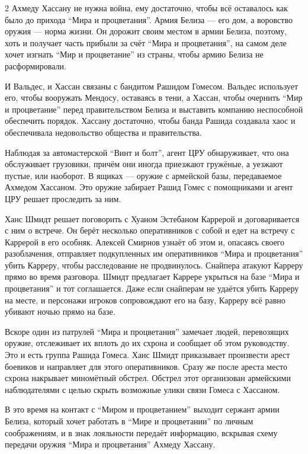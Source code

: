 \documentclass[twoside]{article}
\begin{document}
\begin{multicols}{2}
Ахмеду Хассану не нужна война, ему достаточно, чтобы всё оставалось как
было до прихода \enquote{Мира и процветания}. Армия Белиза --- его дом, а
воровство оружия --- норма жизни. Он дорожит своим местом в армии Белиза,
поэтому, хоть и получает часть прибыли за счёт \enquote{Мира и процветания}, на
самом деле хочет изгнать \enquote{Мир и процветание} из страны, чтобы армию
Белиза не расформировали.

И Вальдес, и Хассан связаны с бандитом Рашидом Гомесом. Вальдес
использует его, чтобы вооружать Мендосу, оставаясь в тени, а Хассан,
чтобы очернить \enquote{Мир и процветание} перед правительством Белиза и
выставить компанию неспособной обеспечить порядок. Хассану достаточно,
чтобы банда Рашида создавала хаос и обеспечивала недовольство общества и
правительства.

Наблюдая за автомастерской \enquote{Винт и болт}, агент ЦРУ обнаруживает, что
она обслуживает грузовики, причём они иногда приезжают гружёные, а
уезжают пустые, или наоборот. В ящиках --- оружие с армейской базы,
передаваемое Ахмедом Хассаном. Это оружие забирает Рашид Гомес с
помощниками и агент ЦРУ решает проследить за ним.

Ханс Шмидт решает поговорить с Хуаном Эстебаном Каррерой и
договаривается с ним о встрече. Он берёт несколько оперативников с собой
и едет на встречу с Каррерой в его особняк. Алексей Смирнов узнаёт об
этом и, опасаясь своего разоблачения, отправляет подкупленных им
оперативников \enquote{Мира и процветания} убить Карреру, чтобы расследование не
продвинулось. Снайпера атакуют Карреру прямо во время разговора. Шмидт
предлагает Каррере укрыться на базе \enquote{Мира и процветания} и тот
соглашается. Даже если снайперам не удаётся убить Карреру на месте, и
персонажи игроков сопровождают его на базу, Карреру всё равно убивают
ночью прямо на базе.

Вскоре один из патрулей \enquote{Мира и процветания} замечает людей, перевозящих
оружие, отслеживает их вплоть до их схрона и сообщает об этом
руководству. Это и есть группа Рашида Гомеса. Ханс Шмидт приказывает
произвести арест боевиков и направляет для этого оперативников. Сразу же
после ареста место схрона накрывает миномётный обстрел. Обстрел этот
организован армейскими наблюдателями с целью скрыть возможные улики
связи Гомеса с Хассаном.

В это время на контакт с \enquote{Миром и процветанием} выходит сержант армии
Белиза, который хочет работать в \enquote{Мире и процветании} по личным
соображениям, и в знак лояльности передаёт информацию, вскрывая схему
передачи оружия \enquote{Мира и процветания} Ахмеду Хассану.


\end{multicols}
\end{document}
